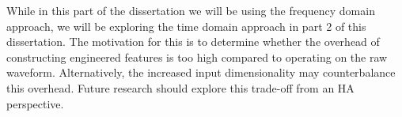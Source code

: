 \documentclass[logo,bsc,singlespacing,parskip,online]{infthesis}
\begin{document}
While in this part of the dissertation we will be using the frequency domain approach,
we will be exploring the time domain approach in part 2 of this dissertation. 
The motivation for this is to determine whether the overhead of constructing engineered features is too high compared to operating on the raw waveform. 
Alternatively, the increased input dimensionality may counterbalance this overhead. Future research should explore this trade-off from an HA perspective.



\end{document}
